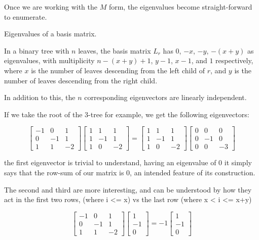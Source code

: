\documentclass{article}
\begin{document}
Once we are working with the $M$ form, the eigenvalues become straight-forward to enumerate.

\begin{theorem} Eigenvalues of a basis matrix.

	In a binary tree with $n$ leaves, the basis matrix $L_r$ has $0$, $-x$, $-y$, $-(x + y)$ as eigenvalues, with multiplicity $n-(x+y)+1$, $y-1$, $x-1$, and $1$ respectively, where $x$ is the number of leaves descending from the left child of $r$, and $y$ is the number of leaves descending from the right child.

	In addition to this, the $n$ corresponding eigenvectors are linearly independent.
\end{theorem}


If we take the root of the 3-tree for example, we get the following
eigenvectors:

\begin{equation*}
\left[\begin{matrix}
	-1 & 0 & 1\\
	0 & -1 & 1\\
	1 & 1 & -2
\end{matrix}\right]
\left[\begin{matrix}
	1 & 1 & 1\\
	1 & -1 & 1\\
	1 & 0 & -2
\end{matrix}\right]
=
\left[\begin{matrix}
	1 & 1 & 1\\
	1 & -1 & 1\\
	1 & 0 & -2
\end{matrix}\right]
\left[\begin{matrix}
	0 & 0 & 0\\
	0 & -1 & 0\\
	0 & 0 & -3
\end{matrix}\right]
\end{equation*}

the first eigenvector is trivial to understand, having an eigenvalue of 0 it
simply says that the row-sum of our matrix is 0, an intended feature of its
construction.

The second and third are more interesting, and can be understood by how they
act in the first two rows, (where i <= x) vs the last row (where x < i <= x+y)

\begin{equation*}
\left[\begin{matrix}
	-1 & 0 & 1\\
	0 & -1 & 1\\
	1 & 1 & -2
\end{matrix}\right]
\left[\begin{matrix}
	1\\
	-1\\
	0
\end{matrix}\right]
=
-1
\left[\begin{matrix}
	1\\
	-1\\
	0
\end{matrix}\right]
\end{equation*}
\end{document}
